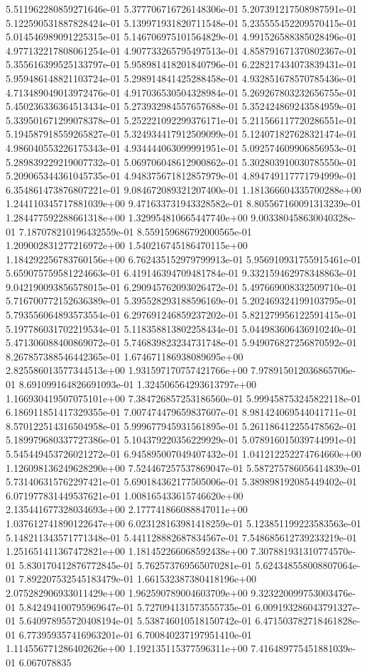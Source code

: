 5.511962280859271646e-01	5.377706716726148306e-01	5.207391217508987591e-01	5.122590531887828424e-01	5.139971931820711548e-01	5.235555452209570415e-01	5.014546989091225315e-01	5.146706975101564829e-01	4.991526588385028496e-01	4.977132217808061254e-01	4.907733265795497513e-01	4.858791671370802367e-01	5.355616399525133797e-01	5.958981418201840796e-01	6.228217434073839431e-01	5.959486148821103724e-01	5.298914841425288458e-01	4.932851678570785436e-01	4.713489049013972476e-01	4.917036530504328984e-01	5.269267803232656755e-01	5.450236336364513434e-01	5.273932984557657688e-01	5.352424869243584959e-01	5.339501671299078378e-01	5.252221092299376171e-01	5.211566117720286551e-01	5.194587918559265827e-01	5.324934417912509099e-01	5.124071827628321474e-01	4.986040553226175343e-01	4.934444063099991951e-01	5.092574609906856953e-01	5.289839229219007732e-01	5.069706048612900862e-01	5.302803910030785550e-01	5.209065344361045735e-01	4.948375671812857979e-01	4.894749117771794999e-01	6.354861473876807221e-01	9.084672089321207400e-01	1.181366604335700288e+00	1.244110345717881039e+00	9.471633731943328582e-01	8.805567160091313239e-01	1.284477592288661318e+00	1.329954810665447740e+00	9.003380458630040328e-01	7.187078210196432559e-01	8.559159686792000565e-01	1.209002831277216972e+00	1.540216745186470115e+00	1.184292256783760156e+00	6.762435152979799913e-01	5.956910931755915461e-01	5.659075759581224663e-01	6.419146394709481784e-01	9.332159462978348863e-01	9.042190093856578015e-01	6.290945762093026472e-01	5.497669008332509710e-01	5.716700772152636389e-01	5.395528293188596169e-01	5.202469324199103795e-01	5.793556064893573554e-01	6.297691246859237202e-01	5.821279956122591415e-01	5.197786031702219534e-01	5.118358813802258434e-01	5.044983606436910240e-01	5.471306088400869072e-01	5.746839823234731748e-01	5.949076827256870592e-01	8.267857388546442365e-01	1.674671186938089695e+00	2.825586013577344513e+00	1.931597170757421766e+00	7.978915012036865706e-01	8.691099164826691093e-01	1.324506564293613797e+00	1.166930419507075101e+00	7.384726857253186560e-01	5.999458753245822118e-01	6.186911851417329355e-01	7.007474479659837607e-01	8.981424069544041711e-01	8.570122514316504958e-01	5.999677945931561895e-01	5.261186412255478562e-01	5.189979680337727386e-01	5.104379220356229929e-01	5.078916015039744991e-01	5.545449453726021272e-01	6.945895007049407432e-01	1.041212252274764660e+00	1.126098136249628290e+00	7.524467257537869047e-01	5.587275786056414839e-01	5.731406315762297421e-01	5.690184362177505006e-01	5.389898192085449402e-01	6.071977831449537621e-01	1.008165433615746620e+00	2.135441677328034693e+00	2.177741866088847011e+00	1.037612741890122647e+00	6.023128163981418259e-01	5.123851199223583563e-01	5.148211343571771348e-01	5.441128882687834567e-01	7.548685612739233219e-01	1.251651411367472821e+00	1.181452266068592438e+00	7.307881931310774570e-01	5.830170412876772845e-01	5.762573769565070281e-01	5.624348558008807064e-01	7.892207532545183479e-01	1.661532387380418196e+00	2.075282906933011429e+00	1.962590789004603709e+00	9.323220099753003476e-01	5.842494100795969647e-01	5.727094131573555735e-01	6.009193286043791327e-01	5.640978955720408194e-01	5.538746010518150742e-01	6.471503782718461828e-01	6.773959357416963201e-01	6.700840237197951410e-01	1.114556771286402626e+00	1.192135115377596311e+00	7.416489775451881039e-01	6.067078835